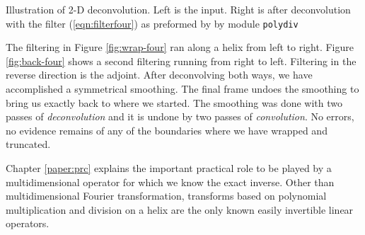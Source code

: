  { 
  Illustration of 2-D deconvolution.
  Left is the input.
  Right is after deconvolution with
  the filter (\protect\ref{eqn:filterfour})
  as preformed by
  by module
  \texttt{polydiv} %
}

The filtering in Figure \ref{fig:wrap-four}
ran along a helix from left to right.
Figure \ref{fig:back-four}
shows a second filtering running from right to left.
Filtering in the reverse direction is the adjoint.
After deconvolving both ways, we have accomplished a symmetrical smoothing.
The final frame undoes the smoothing to bring us exactly back
to where we started.
The smoothing was done with two passes of {\it deconvolution}
and it is undone by two passes of {\it convolution}.
No errors, no evidence remains of any of the boundaries
where we have wrapped and truncated.


\par
Chapter \ref{paper:prc} explains the important practical role
to be played by a multidimensional operator for which
we know the exact inverse.  
Other than multidimensional Fourier transformation,
transforms based on polynomial multiplication and division
on a helix are the only known easily invertible linear operators.


